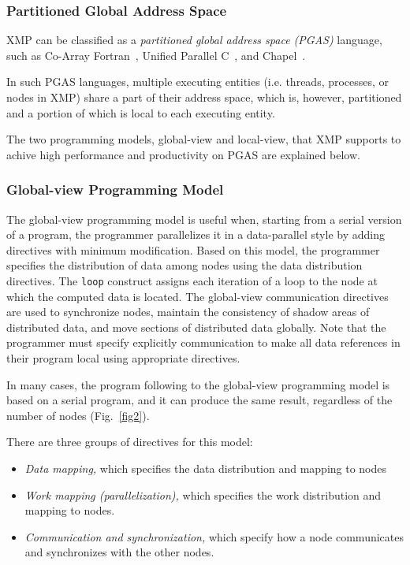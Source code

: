 \subsubsection{Partitioned Global Address Space}

XMP can be classified as a {\it partitioned global address space (PGAS)}
language, such as Co-Array Fortran~\cite{caf}, Unified Parallel
C~\cite{upc}, and Chapel~\cite{chapel}.

In such PGAS languages, multiple executing entities (i.e. threads, processes,
or nodes in XMP) share a part of their address space, which is, however,
partitioned and a portion of which is local to each executing entity.

The two programming models, global-view and local-view, that XMP
supports to achive high performance and productivity on PGAS are
explained below.

\subsubsection{Global-view Programming Model}

The global-view programming model is useful when, starting from a
serial version of a program, the programmer parallelizes it in a
data-parallel style by adding directives with minimum modification.
%
Based on this model, the programmer specifies the distribution of data among
nodes using the data distribution directives.
%
The {\tt loop} construct assigns each iteration of a loop to the node
at which the computed data is located. 
%
The global-view communication directives are used to synchronize nodes,
maintain the consistency of shadow areas of distributed data, and move
sections of distributed data globally.
%
Note that the programmer must specify explicitly communication to make
all data references in their program local using appropriate
directives.

In many cases, the {\XMP} program following to the global-view
programming model is based on a serial program, and it can produce
the same result, regardless of the number of nodes (Fig.~\ref{fig2}).

There are three groups of directives for this model:

\begin{itemize}
  \item {\it Data mapping,} which specifies the data distribution and mapping
		to nodes
  \item {\it Work mapping (parallelization),} which specifies the work
		distribution and mapping to nodes.
  \item {\it Communication and synchronization,} which specify how a
		node communicates and synchronizes with the other nodes.
\end{itemize}

